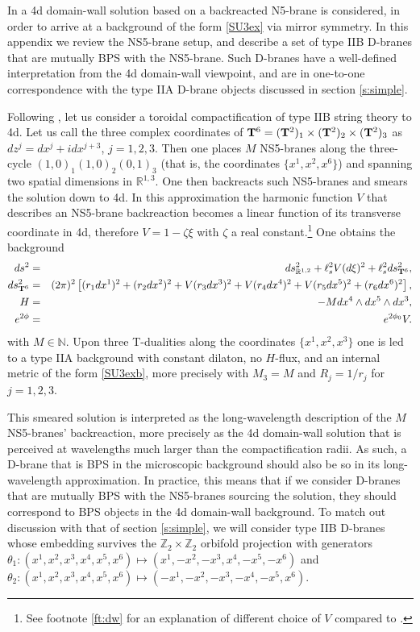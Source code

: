\documentclass[11pt]{article}
\def\bea{\begin{eqnarray}}
\def\eea{\end{eqnarray}}
\newcommand{\IR}{\mathbb{R}}
\newcommand{\IZ}{\mathbb{Z}}
\begin{document}
In  \cite{Gurrieri:2002wz} a 4d domain-wall solution based on a backreacted N5-brane is considered, in order to arrive at a background of the form \eqref{SU3ex} via mirror symmetry. In this appendix we review the NS5-brane setup, and describe a set of type IIB D-branes that are mutually BPS with the NS5-brane. Such D-branes have a well-defined interpretation from the 4d domain-wall viewpoint, and are in one-to-one correspondence with the type IIA D-brane objects discussed in section \ref{s:simple}. 

Following  \cite{Gurrieri:2002wz}, let us consider a toroidal compactification of type IIB string theory to 4d. Let us call the three complex coordinates of ${\bf T}^6 = ({\bf T}^2)_1 \times ({\bf T}^2)_2 \times ({\bf T}^2)_3$ as $dz^j = dx^j + i dx^{j+3}$, $j=1,2,3$. Then one places $M$ NS5-branes along the three-cycle $(1,0)_1(1,0)_2(0,1)_3$ (that is, the coordinates $\{x^1, x^2, x^6\}$) and spanning two spatial dimensions in $\IR^{1,3}$. One then backreacts such NS5-branes and smears the solution down to 4d. In this approximation the harmonic function $V$ that describes an NS5-brane backreaction becomes a linear function of its transverse coordinate in 4d, therefore $V = 1- \zeta \xi$ with $\zeta$ a real constant.\footnote{See footnote \ref{ft:dw} for an explanation of different choice of $V$ compared to \cite{Gurrieri:2002wz}.} One obtains the background
\bea
\label{Hex}
ds^2 &= &ds^2_{\IR^{1,2}}+ \ell_s^2 V(d\xi)^2 + \ell_s^2 ds^2_{{\bf T}^6}, \\
ds^2_{{\bf T}^6} & = & (2\pi)^2 \left[ (r_1 dx^1)^2+(r_2 dx^2)^2+V(r_3 dx^3)^2+V( r_4 dx^4)^2+V(r_5 dx^5)^2+(r_6 dx^6)^2 \right] , \\
H & = & - M dx^4 \wedge dx^5 \wedge dx^3, \\
e^{2\phi} & = & e^{2\phi_0} V .
\eea
with $M \in \mathbb{N}$. Upon three T-dualities along the coordinates $\{x^1, x^2, x^3\}$ one is led to a type IIA background with constant dilaton, no $H$-flux, and an internal metric of the form \eqref{SU3exb}, more precisely with $M_3=M$ and $R_j = 1/r_j$ for $j=1,2,3$. 

This smeared solution is interpreted as the long-wavelength description of the $M$ NS5-branes'  backreaction, more precisely as the 4d domain-wall solution that is perceived at wavelengths much larger than the compactification radii. As such, a D-brane that is BPS in the microscopic background should also be so in its long-wavelength approximation. In practice, this means that if we consider D-branes that are mutually BPS with the NS5-branes sourcing the solution, they should correspond to BPS objects in the 4d domain-wall background. To match out discussion with that of section \ref{s:simple}, we will consider type IIB D-branes whose embedding survives the $\IZ_2 \times \IZ_2$ orbifold projection with generators $\theta_1: (x^1, x^2, x^3, x^4, x^5, x^6) \mapsto  (x^1, -x^2, -x^3, x^4, -x^5, -x^6)$ and $\theta_2: (x^1, x^2, x^3, x^4, x^5, x^6) \mapsto  (-x^1, -x^2, -x^3, -x^4, -x^5, x^6)$.
\end{document}
